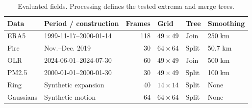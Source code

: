 \begin{table}[t]
\caption{Evaluated fields. Processing defines the tested extrema and merge trees.}\label{tab:data}
\centering\footnotesize
\setlength{\tabcolsep}{3pt}
\begin{tabular}{llrlll}\toprule
Data & Period / construction & Frames & Grid & Tree & Smoothing\\\midrule
ERA5 & 1999-11-17--2000-01-14 & 118 & $49\times49$ & Join & 250 km\\
Fire & Nov.--Dec. 2019 & 30 & $64\times64$ & Split & 50.7 km\\
OLR & 2024-06-01--2024-07-30 & 60 & $49\times49$ & Join & 500 km\\
PM2.5 & 2000-01-01--2000-01-30 & 30 & $49\times49$ & Split & 100 km\\
Ring & Synthetic expansion & 40 & $14\times14$ & Split & None\\
Gaussians & Synthetic motion & 64 & $64\times64$ & Split & None\\
\bottomrule\end{tabular}
\par{}
\end{table}
